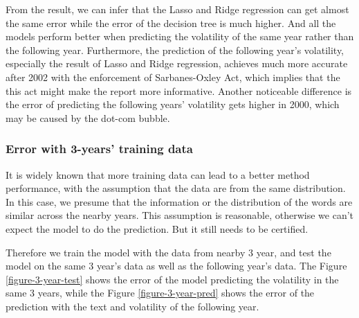 \documentclass[11pt]{article}
\begin{document}
From the result, we can infer that the Lasso and Ridge regression can get almost the same error while the error of the decision tree is much higher. And all the models perform better when predicting the volatility of the same year rather than the following year. Furthermore, the prediction of the following year's volatility, especially the result of Lasso and Ridge regression, achieves much more accurate after 2002 with the enforcement of Sarbanes-Oxley Act, which implies that the this act might make the report more informative. Another noticeable difference is the error of predicting the following years' volatility gets higher in 2000, which may be caused by the dot-com bubble.

\subsubsection{Error with 3-years' training data}

It is widely known that more training data can lead to a better method performance, with the assumption that the data are from the same distribution. In this case, we presume that the information or the distribution of the words are similar across the nearby years. This assumption is reasonable, otherwise we can't expect the model to do the prediction. But it still needs to be certified.

Therefore we train the model with the data from nearby 3 year, and test the model on the same 3 year's data as well as the following year's data. The Figure \ref{figure-3-year-test} shows the error of the model predicting the volatility in the same 3 years, while the Figure \ref{figure-3-year-pred} shows the error of the prediction with the text and volatility of the following year.

\end{document}
